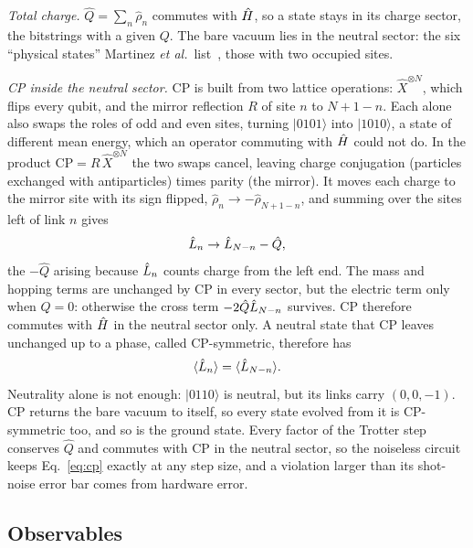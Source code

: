 \emph{Total charge.} $\hat Q = \sum_n \hat\rho_n$ commutes with $\hat{H}$, so a
state stays in its charge sector, the bitstrings with a given $Q$. The bare
vacuum lies in the neutral sector: the six ``physical states'' Martinez
\emph{et al.}\ list~\cite{martinez2016}, those with two occupied sites.

\emph{CP inside the neutral sector.} CP is built from two lattice operations:
$\hat X^{\otimes N}$, which flips every qubit, and the mirror reflection $R$ of
site $n$ to $N+1-n$. Each alone also swaps the roles of odd and even sites,
turning $|0101\rangle$ into $|1010\rangle$, a state of different mean energy,
which an operator commuting with $\hat{H}$ could not do. In the product
$\mathrm{CP} = R\,\hat X^{\otimes N}$ the two swaps cancel, leaving charge
conjugation (particles exchanged with antiparticles) times parity (the mirror).
It moves each charge to the mirror site with its sign flipped,
$\hat\rho_n \to -\hat\rho_{N+1-n}$, and summing over the sites left of link $n$
gives
\begin{equation}
  \label{eq:cpL}
  \hat{L}_{n} \to \hat{L}_{N-n} - \hat Q ,
\end{equation}
the $-\hat Q$ arising because $\hat{L}_{n}$ counts charge from the left end. The
mass and hopping terms are unchanged by CP in every sector, but the electric
term only when $Q = 0$: otherwise the cross term $-2\hat Q\hat{L}_{N-n}$ survives.
CP therefore commutes with $\hat{H}$ in the neutral sector only. A neutral
state that CP leaves unchanged up to a phase, called CP-symmetric, therefore has
\begin{equation}
  \label{eq:cp}
  \langle \hat{L}_{n} \rangle = \langle \hat{L}_{N-n} \rangle .
\end{equation}
Neutrality alone is not enough: $|0110\rangle$ is neutral, but its links carry
$(0, 0, -1)$. CP returns the bare vacuum to itself, so every state evolved from
it is CP-symmetric too, and so is the ground state. Every factor of the Trotter
step conserves $\hat Q$ and commutes with CP in the neutral sector, so the
noiseless circuit keeps Eq.~\eqref{eq:cp} exactly at any step size, and a
violation larger than its shot-noise error bar comes from hardware error.

\subsection{Observables}
\label{sec:observables}

